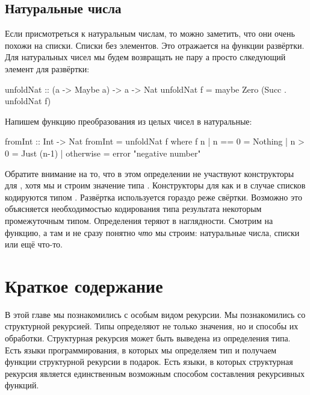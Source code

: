 
\subsection{Натуральные числа}

Если присмотреться к натуральным числам, то можно заметить, что они
очень похожи на списки. Списки без элементов. Это отражается на функции
развёртки. Для натуральных чисел мы будем возвращать не пару а просто
слкедующий элемент для развёртки:


\begin{code}
unfoldNat :: (a -> Maybe a) -> a -> Nat
unfoldNat f = maybe Zero (Succ . unfoldNat f)
\end{code}

Напишем функцию преобразования из целых чисел в натуральные:


\begin{code}
fromInt :: Int -> Nat
fromInt = unfoldNat f
    where f n
            | n == 0    = Nothing
            | n >  0    = Just (n-1)
            | otherwise = error "negative number"
\end{code}

Обратите внимание на то, что в этом определении не участвуют
конструкторы для , хотя мы и строим значение типа .
Конструкторы для  как и в случае списков кодируются типом
. Развёртка используется гораздо реже свёртки. Возможно это
объясняется необходимостью кодирования типа результата некоторым
промежуточным типом. Определения теряют в наглядности. Смотрим на
функцию, а там  и не сразу понятно \emph{что} мы строим:
натуральные числа, списки или ещё что-то.

\section{Краткое содержание}

В этой главе мы познакомились с особым видом рекурсии. Мы познакомились
со структурной рекурсией. Типы определяют не только значения, но и
способы их обработки. Структурная рекурсия может быть выведена из
определения типа. Есть языки программирования, в которых мы определяем
тип и получаем функции структурной рекурсии в подарок. Есть языки, в
которых структурная рекурсия является единственным возможным способом
составления рекурсивных функций.

